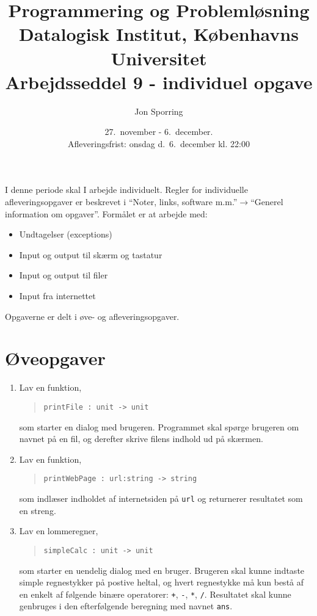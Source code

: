 \documentclass[a4paper,12pt]{article}
\title{Programmering og Problemløsning\\Datalogisk Institut,
  Københavns Universitet\\Arbejdsseddel 9 - individuel opgave}
\author{Jon Sporring}
\date{27.\ november - 6.\ december.\\Afleveringsfrist: onsdag d.\ 6.\ december kl. 22:00}
\begin{document}
\maketitle

I denne periode skal I arbejde individuelt. Regler for individuelle afleveringsopgaver er beskrevet i "`Noter, links, software m.m."'$\rightarrow$"`Generel information om opgaver"'. Formålet er at arbejde med:
\begin{itemize}
\item Undtagelser (exceptions)
\item Input og output til skærm og tastatur
\item Input og output til filer
\item Input fra internettet
\end{itemize}

Opgaverne er delt i øve- og afleveringsopgaver. 

\section*{Øveopgaver}
\begin{enumerate}[label=9ø.\arabic*,start=0]
\item Lav en funktion,
  \begin{quote}
    \mbox{\lstinline!printFile : unit -> unit!}
  \end{quote}
  som starter en dialog med brugeren. Programmet skal spørge brugeren om navnet på en fil, og derefter skrive filens indhold ud på skærmen.
\item Lav en funktion, 
  \begin{quote}
    \mbox{\lstinline!printWebPage : url:string -> string!}
  \end{quote}
  som indlæser indholdet af internetsiden på \lstinline!url! og returnerer resultatet som en streng.
\item Lav en lommeregner,
  \begin{quote}
    \mbox{\lstinline!simpleCalc : unit -> unit!}
  \end{quote}
  som starter en uendelig dialog med en bruger. Brugeren skal kunne indtaste simple regnestykker på postive heltal, og hvert regnestykke må kun bestå af en enkelt af følgende binære operatorer: \lstinline!+!, \lstinline!-!, \lstinline!*!, \lstinline!/!. Resultatet skal kunne genbruges i den efterfølgende beregning med navnet \lstinline!ans!.
\end{enumerate}
\end{document}

